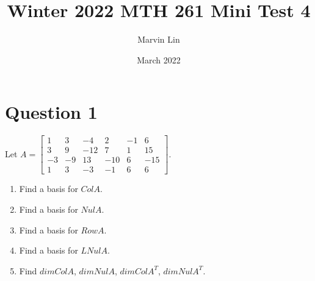 \documentclass{report}
\title{Winter 2022 MTH 261 Mini Test 4}
\author{Marvin Lin}
\date{March 2022}
\begin{document}
\maketitle

\section*{Question 1}
\begin{example}
    Let $A = \begin{bmatrix} 1 & 3 & -4 & 2 & -1 & 6 \\ 3 & 9 & -12 & 7 & 1 & 15 \\ -3 & -9 & 13 & -10 & 6 & -15 \\ 1 & 3 & -3 & -1 & 6 & 6 \end{bmatrix}$.
    
    \begin{enumerate}
    \item Find a basis for $Col A$.
    \item Find a basis for $Nul A$.
    \item Find a basis for $Row A$.
    \item Find a basis for $LNul A$.
    \item Find $dim Col A$, $dim Nul A$, $dim Col A^T$, $dim Nul A^T$.
    \end{enumerate}
\end{example}
\end{document}
